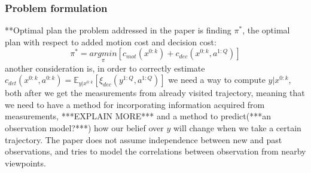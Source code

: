 \documentclass{article}
\begin{document}
	\subsubsection{Problem formulation}
	**Optimal plan
	the problem addressed in the paper is finding $\pi^*$, the optimal plan with respect to added motion cost and decision cost:
	\begin{equation}
	\pi^* = \underset{\pi}{argmin}[c_{mot}(x^{0:k}) + c_{dec}(x^{0:k},a^{1:Q})]
	\end{equation}
	another consideration is, in order to correctly estimate $c_{det}(x^{0:k},a^{0:k})=\mathbb{E}_{y|x^{0:k}}[\xi_{dec}(y^{1:Q},a^{1:Q})]$ 
	we need a way to compute $y|x^{0:k}$, both 
	after we get the measurements from already visited trajectory, meaning that we need to have a method for incorporating information acquired from measurements, ***EXPLAIN MORE***
	and a method to predict(***an observation model?***) how our belief over $y$ will change when we take a certain trajectory. The paper does not assume independence between new and past observations, and tries to model the correlations between observation from nearby viewpoints.  
	
\end{document}
